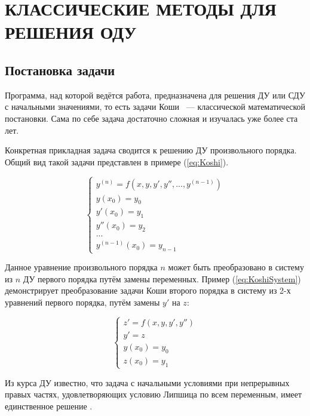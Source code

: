 \section{КЛАССИЧЕСКИЕ МЕТОДЫ ДЛЯ РЕШЕНИЯ ОДУ}

\subsection{Постановка задачи}

Программа, над которой ведётся работа, предназначена для решения ДУ или СДУ
с начальными значениями, то есть задачи Коши ~--- классической математической постановки. 
Сама по себе задача достаточно сложная и изучалась уже более ста лет.

Конкретная прикладная задача сводится к решению ДУ произвольного порядка. Общий вид такой задачи представлен
в примере (\ref{eq:Koshi}).

\begin{equation}
    \begin{cases}
        y^{(n)} = f(x, y, y', y'', ..., y^{(n - 1)})\\
        y(x_0) = y_0\\
        y'(x_0) = y_1\\
        y''(x_0) = y_2\\
        ...\\
        y^{(n - 1)}(x_0) = y_{n - 1}
    \end{cases}
    \label{eq:Koshi}
\end{equation}

Данное уравнение произвольного порядка $n$ может быть преобразовано в систему из $n$ ДУ первого порядка путём
замены переменных. Пример (\ref{eq:KoshiSystem}) демонстрирует преобразование задачи Коши второго порядка в систему из 2-х уравнений
первого порядка, путём замены $y'$ на $z$:

\begin{equation}
    \begin{cases}
        z' = f(x, y, y', y'')\\
        y' = z\\
        y(x_0) = y_0\\
        z(x_0) = y_1
    \end{cases}
    \label{eq:KoshiSystem}
\end{equation}

Из курса ДУ известно, что задача с начальными условиями при непрерывных правых частях, удовлетворяющих условию
Липшица по всем переменным, имеет единственное решение \cite{journal2, book4}.

